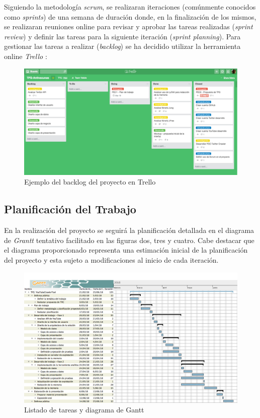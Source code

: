 \documentclass[11pt,a4paper]{article}
\begin{document}
Siguiendo la metodología \textit{scrum}, se realizaran iteraciones (comúnmente conocidos como \textit{sprints}) de una semana de duración donde, en la finalización de los mismos, se realizaran reuniones online para revisar y aprobar las tareas realizadas (\textit{sprint review}) y definir las tareas para la siguiente iteración (\textit{sprint planning}). Para gestionar las tareas a realizar (\textit{backlog}) se ha decidido utilizar la herramienta online \textit{Trello} \cite{9}:

\begin{figure}[hbtp]
\centering
\includegraphics[scale=0.3]{planificacion/trello-backlog.png}
\caption{Ejemplo del backlog del proyecto en Trello}
\end{figure}

\subsection{Planificación del Trabajo}
En la realización del proyecto se seguirá la planificación detallada en el diagrama de \textit{Grantt} tentativo facilitado en las figuras dos, tres y cuatro. Cabe destacar que el diagrama proporcionado representa una estimación inicial de la planificación del proyecto y esta sujeto a modificaciones al inicio de cada iteración.

\begin{figure}[H]
\centering
\includegraphics[scale=0.25]{planificacion/planificacion.png}
\caption{Listado de tareas y diagrama de Gantt}
\end{figure}
\end{document}
